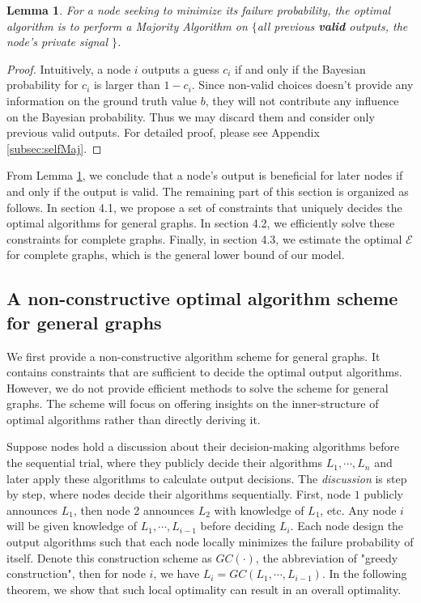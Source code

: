 \documentclass[a4paper,UKenglish]{lipics}
\newtheorem{lem}[thm]{Lemma}
\theoremstyle{definition}
\begin{document}
\begin{lem}
\label{lem:selfMaj}
For a node seeking to minimize its failure probability, 
	the optimal algorithm is to perform a Majority Algorithm on 
	$\{$all previous \textbf{valid} outputs, the node's private signal $\}$.
\end{lem}
\begin{proof}
Intuitively, a node $i$ outputs a guess $c_i$ if and only if the Bayesian probability for $c_i$ is larger than $1 - c_i$.
Since non-valid choices doesn't provide any information on the ground truth value $b$,
	they will not contribute any influence on the Bayesian probability.
Thus we may discard them and consider only previous valid outputs.
For detailed proof, please see Appendix \ref{subsec:selfMaj}.
\end{proof}

From Lemma \ref{lem:selfMaj}, we conclude that a node's output is beneficial for later nodes if and only if the output is valid.
The remaining part of this section is organized as follows.
In section 4.1, we propose a set of constraints that uniquely decides the optimal algorithms for general graphs. 
In section 4.2, we efficiently solve these constraints for complete graphs. 
Finally, in section 4.3, we estimate the optimal $\mathcal{E}$ for complete graphs, which is the general lower bound of our model.


\subsection{A non-constructive optimal algorithm scheme for general graphs}
\label{Construction}
We first provide a non-constructive algorithm scheme for general graphs.
It contains constraints that are sufficient to decide the optimal output algorithms.
However, we do not provide efficient methods to solve the scheme for general graphs.
The scheme will focus on offering insights on the inner-structure of optimal algorithms rather than directly deriving it.

Suppose nodes hold a discussion about their decision-making algorithms before the sequential trial, 
	where they publicly decide their algorithms $L_1,\dotsb,L_n$ and later apply these algorithms to calculate output decisions.
The \emph{discussion} is step by step, where nodes decide their algorithms sequentially.
First, node $1$ publicly announces $L_1$, then node 2 announces $L_2$ with knowledge of $L_1$, etc. 
Any node $i$ will be given knowledge of $L_1, \dotsb, L_{i-1}$ before deciding $L_i$.
Each node design the output algorithms such that each node locally minimizes the failure probability of itself.
Denote this construction scheme as $GC(\cdot)$, the abbreviation of "greedy construction",
	then for node $i$, we have $L_i = GC(L_1,\dotsb,L_{i-1})$.
In the following theorem, we show that such local optimality can result in an overall optimality.
\end{document}
